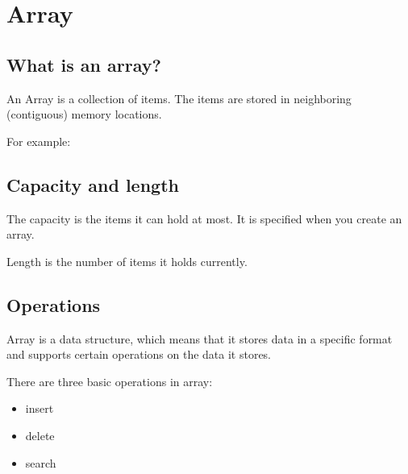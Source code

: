 
\chapter{Array}

\section{What is an array?}

An Array is a collection of items.
The items are stored in neighboring (contiguous) memory locations.


For example:

\section{Capacity and length}

The capacity is the items it can hold at most.
It is specified when you create an array.

Length is the number of items it holds currently.


\section{Operations}

Array is a data structure, which means that it stores data in a specific format and supports certain operations on the data it stores.


There are three basic operations in array:
\begin{itemize}
\item insert
\item delete
\item search
\end{itemize}


